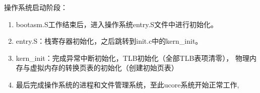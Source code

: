         操作系统启动阶段：
        \begin{enumerate}
            \item
                bootasm.S工作结束后，进入操作系统entry.S文件中进行初始化。
            \item
                entry.S：栈寄存器初始化，之后跳转到init.c中的kern\_init。
            \item
                kern\_init：完成异常中断初始化，TLB初始化（全部TLB表项清零），%
                物理内存与虚拟内存的转换页表的初始化（创建初始页表）
            \item
                最后完成操作系统的进程和文件管理系统，至此ucore系统开始正常工作,
        \end{enumerate}
        

